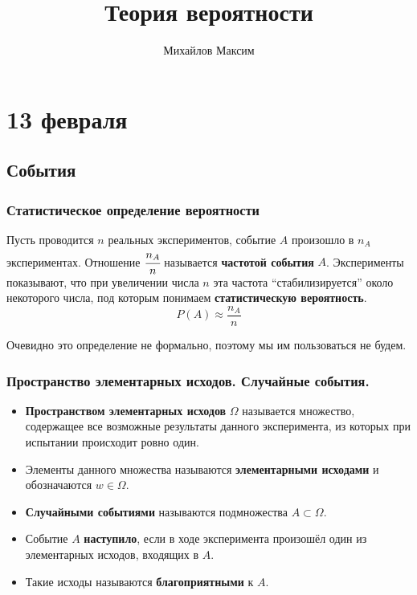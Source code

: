 \documentclass[12pt, a4paper, oneside]{book}
\begin{document}
\title{Теория вероятности}
\author{Михайлов Максим}

\maketitle

\tableofcontents

\chapter{13 февраля}

\section{События}

\subsection{Статистическое определение вероятности}

\begin{definition}
    Пусть проводится \(n\) реальных экспериментов, событие \(A\) произошло в \(n_A\) экспериментах. Отношение \(\cfrac{n_A}{n}\) называется \textbf{частотой события} \(A\). Эксперименты показывают, что при увеличении числа \(n\) эта частота ``стабилизируется'' около некоторого числа, под которым понимаем \textbf{статистическую вероятность}.
    \[P(A)\approx \frac{n_A}{n}\]
\end{definition}

Очевидно это определение не формально, поэтому мы им пользоваться не будем.

\subsection{Пространство элементарных исходов. Случайные события.}

\begin{definition}\itemfix
    \begin{itemize}
        \item \textbf{Пространством элементарных исходов} \(\Omega\) называется множество, содержащее все возможные результаты данного эксперимента, из которых при испытании происходит ровно один.
        \item Элементы данного множества называются \textbf{элементарными исходами} и обозначаются \(w\in \Omega\).
        \item \textbf{Случайными событиями} называются подмножества \(A\subset \Omega\).
        \item Событие \(A\) \textbf{наступило}, если в ходе эксперимента произошёл один из элементарных исходов, входящих в \(A\).
        \item Такие исходы называются \textbf{благоприятными} к \(A\).
    \end{itemize}
\end{definition}
\end{document}
